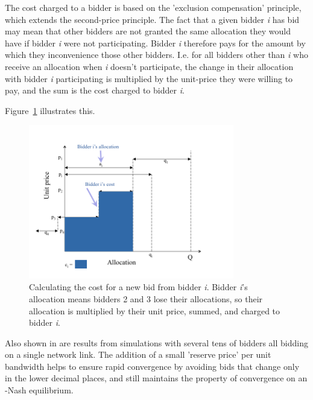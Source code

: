 The cost charged to a bidder is based on the 'exclusion compensation' principle, which extends the second-price principle. The fact that a given bidder {\it i} has bid may mean that other bidders are not granted the same allocation they would have if bidder {\it i} were not participating. Bidder {\it i} therefore pays for the amount by which they inconvenience those other bidders. I.e. for all bidders other than {\it i} who receive an allocation when {\it i} doesn't participate, the change in their allocation with bidder {\it i} participating is multiplied by the unit-price they were willing to pay, and the sum is the cost charged to bidder {\it i}.

Figure~\ref{fig:cost} illustrates this.

\begin{figure}[h]
 \centering
   \includegraphics[width=0.8\textwidth]{cost}
       \caption{Calculating the cost for a new bid from bidder {\it i}. Bidder {\it i}'s allocation means bidders 2 and 3 lose their allocations, so their allocation is multiplied by their unit price, summed, and charged to bidder {\it i}.}
 \label{fig:cost}
\end{figure}

Also shown in \cite{PSP} are results from simulations with several tens of bidders all bidding on a single network link. The addition of a small 'reserve price' per unit bandwidth helps to ensure rapid convergence by avoiding bids that change only in the lower decimal places, and still maintains the property of convergence on an \textepsilon-Nash equilibrium.